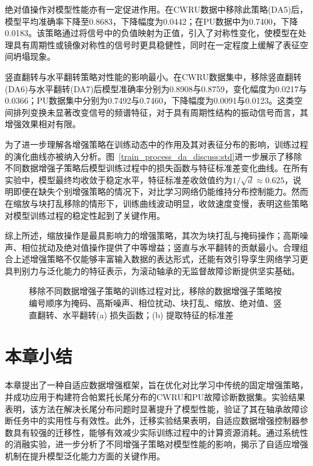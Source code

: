 \documentclass[master]{thesis-uestc}
\begin{document}
绝对值操作对模型性能亦有一定促进作用。在CWRU数据中移除此策略(DA5)后，模型平均准确率下降至0.8683，下降幅度为0.0442；在PU数据中为0.7400，下降0.0183。该策略通过将信号中的负值映射为正值，引入了对称性变化，使模型在处理具有周期性或镜像对称性的信号时更具稳健性，同时在一定程度上缓解了表征空间坍塌现象。

竖直翻转与水平翻转策略对性能的影响最小。在CWRU数据集中，移除竖直翻转(DA6)与水平翻转(DA7)后模型准确率分别为0.8908与0.8759，变化幅度为0.0217与0.0366；PU数据集中分别为0.7492与0.7460，下降幅度为0.0091与0.0123。这类空间排列变换未显著改变信号的频谱特征，对于具有周期性结构的振动信号而言，其增强效果相对有限。

为了进一步理解各增强策略在训练动态中的作用及其对表征分布的影响，训练过程的演化曲线亦被纳入分析。图~\ref{train_process_da_discuss:std}进一步展示了移除不同数据增强子策略后模型训练过程中的损失函数与特征标准差变化曲线。在所有实验中，模型最终均收敛于稳定水平，特征标准差收敛值约为$1/\sqrt{d} \approx 0.625$，说明即便在缺失个别增强策略的情况下，对比学习网络仍能维持分布控制能力。然而在缩放与块打乱移除的情形下，训练曲线波动明显，收敛速度变慢，表明这些策略对模型训练过程的稳定性起到了关键作用。

综上所述，缩放操作是最具影响力的增强策略，其次为块打乱与掩码操作；高斯噪声、相位扰动及绝对值操作提供了中等增益；竖直与水平翻转的贡献最小。合理组合上述增强策略不仅能够丰富输入数据的表达形式，还能有效引导孪生网络学习更具判别力与泛化能力的特征表示，为滚动轴承的无监督故障诊断提供坚实基础。
\begin{figure}[H]
    \centering
    \caption{移除不同数据增强子策略的训练过程对比，移除的数据增强子策略按编号顺序为掩码、高斯噪声、相位扰动、块打乱、缩放、绝对值、竖直翻转、水平翻转(a) 损失函数；(b) 提取特征的标准差}
    \label{train_process_da_discuss}
\end{figure}

\FloatBarrier  %
\section{本章小结}
本章提出了一种自适应数据增强框架，旨在优化对比学习中传统的固定增强策略，并成功应用于构建符合帕累托长尾分布的CWRU和PU故障诊断数据集。实验结果表明，该方法在解决长尾分布问题时显著提升了模型性能，验证了其在轴承故障诊断任务中的实用性与有效性。此外，迁移实验结果表明，自适应数据增强控制器参数具有较强的迁移性，能够有效减少实际训练过程中的计算资源消耗。通过系统性的消融实验，进一步分析了不同增强子策略对模型性能的影响，揭示了自适应增强机制在提升模型泛化能力方面的关键作用。
\end{document}
